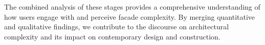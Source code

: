 The combined analysis of these stages provides a comprehensive understanding of how users engage with and perceive facade complexity.
By merging quantitative and qualitative findings, we contribute to the discourse on architectural complexity and its impact on contemporary design and construction.
